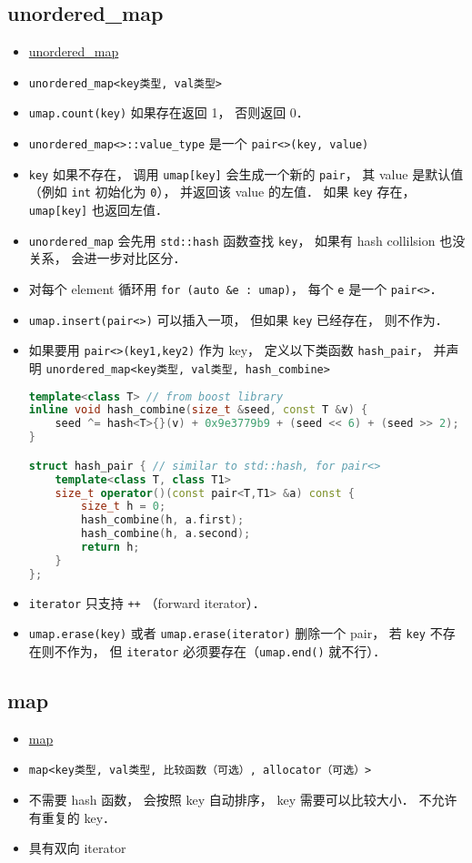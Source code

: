 \subsection{unordered\_map}
\begin{itemize}
\item \href{https://cplusplus.com/reference/unordered_map/unordered_map/}{unordered\_map}
\item \verb|unordered_map<key类型, val类型>|
\item \verb|umap.count(key)| 如果存在返回 1， 否则返回 0．
\item \verb|unordered_map<>::value_type| 是一个 \verb|pair<>(key, value)|
\item \verb|key| 如果不存在， 调用 \verb|umap[key]| 会生成一个新的 \verb|pair|， 其 value 是默认值 （例如 \verb|int| 初始化为 \verb|0|）， 并返回该 value 的左值． 如果 \verb|key| 存在， \verb|umap[key]| 也返回左值．
\item \verb|unordered_map| 会先用 \verb|std::hash| 函数查找 \verb|key|， 如果有 hash collilsion 也没关系， 会进一步对比区分．
\item 对每个 element 循环用 \verb|for (auto &e : umap)|， 每个 \verb|e| 是一个 \verb|pair<>|．
\item \verb|umap.insert(pair<>)| 可以插入一项， 但如果 \verb|key| 已经存在， 则不作为．
\item 如果要用 \verb|pair<>(key1,key2)| 作为 key， 定义以下类函数 \verb|hash_pair|， 并声明 \verb|unordered_map<key类型, val类型, hash_combine>|
\begin{lstlisting}[language=cpp]
template<class T> // from boost library
inline void hash_combine(size_t &seed, const T &v) {
    seed ^= hash<T>{}(v) + 0x9e3779b9 + (seed << 6) + (seed >> 2);
}

struct hash_pair { // similar to std::hash, for pair<>
    template<class T, class T1>
    size_t operator()(const pair<T,T1> &a) const {
        size_t h = 0;
        hash_combine(h, a.first);
        hash_combine(h, a.second);
        return h;
    }
};
\end{lstlisting}
\item \verb|iterator| 只支持 \verb|++| （forward iterator）．
\item \verb|umap.erase(key)| 或者 \verb|umap.erase(iterator)| 删除一个 pair， 若 \verb|key| 不存在则不作为， 但 \verb|iterator| 必须要存在（\verb|umap.end()| 就不行）．
\end{itemize}

\subsection{map}
\begin{itemize}
\item \href{https://cplusplus.com/reference/map/map/}{map}
\item \verb|map<key类型, val类型, 比较函数（可选）, allocator（可选）>|
\item 不需要 hash 函数， 会按照 key 自动排序， key 需要可以比较大小． 不允许有重复的 key．
\item 具有双向 iterator
\end{itemize}


